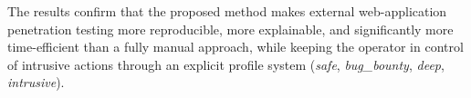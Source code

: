 \begin{SingleSpace}
The results confirm that the proposed method makes external web-application penetration testing more reproducible, more explainable, and significantly more time-efficient than a fully manual approach, while keeping the operator in control of intrusive actions through an explicit profile system (\textit{safe}, \textit{bug\_bounty}, \textit{deep}, \textit{intrusive}).

\end{SingleSpace}
